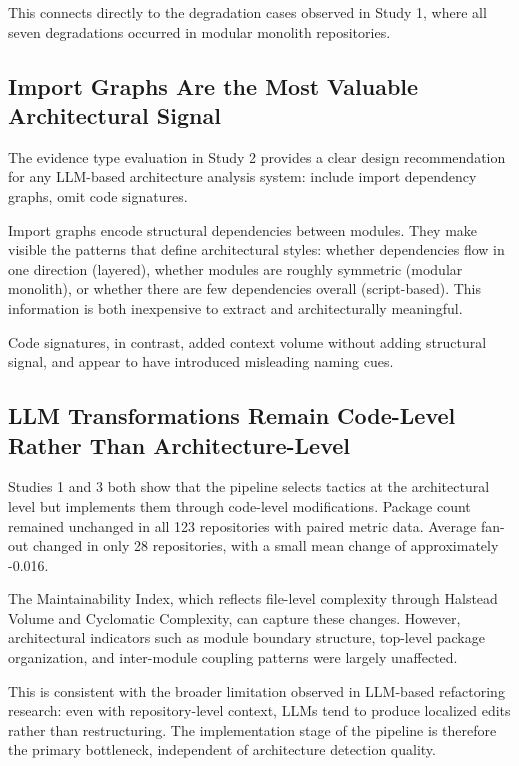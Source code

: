 This connects directly to the degradation cases observed in Study 1, where all seven degradations occurred in modular monolith repositories.

\subsection{Import Graphs Are the Most Valuable Architectural Signal}

The evidence type evaluation in Study 2 provides a clear design recommendation for any LLM-based architecture analysis system: include import dependency graphs, omit code signatures.

Import graphs encode structural dependencies between modules. They make visible the patterns that define architectural styles: whether dependencies flow in one direction (layered), whether modules are roughly symmetric (modular monolith), or whether there are few dependencies overall (script-based). This information is both inexpensive to extract and architecturally meaningful.

Code signatures, in contrast, added context volume without adding structural signal, and appear to have introduced misleading naming cues.

\subsection{LLM Transformations Remain Code-Level Rather Than Architecture-Level}

Studies 1 and 3 both show that the pipeline selects tactics at the architectural level but implements them through code-level modifications. Package count remained unchanged in all 123 repositories with paired metric data. Average fan-out changed in only 28 repositories, with a small mean change of approximately -0.016.

The Maintainability Index, which reflects file-level complexity through Halstead Volume and Cyclomatic Complexity, can capture these changes. However, architectural indicators such as module boundary structure, top-level package organization, and inter-module coupling patterns were largely unaffected.

This is consistent with the broader limitation observed in LLM-based refactoring research: even with repository-level context, LLMs tend to produce localized edits rather than restructuring. The implementation stage of the pipeline is therefore the primary bottleneck, independent of architecture detection quality.

